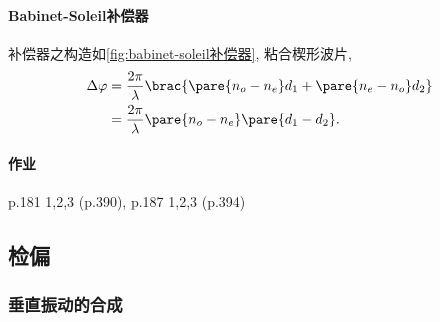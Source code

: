 \documentclass{ctexart}
\begin{document}
\paragraph{Babinet-Soleil补偿器} %
\label{par:babinet_soleil补偿器}

补偿器之构造如\cref{fig:babinet-soleil补偿器}, 粘合楔形波片,
\begin{align*}
    \Delta \varphi &= \frac{2\pi}{\lambda} \brac{\pare{n_o - n_e}d_1 + \pare{n_e - n_o}d_2} \\
    &= \frac{2\pi}{\lambda}\pare{n_o - n_e}\pare{d_1-d_2}.
\end{align*}


\paragraph{作业} %
\label{par:作业}

p.181 1,2,3 (p.390), p.187 1,2,3 (p.394)




\subsection{检偏} %
\label{sub:检偏}

\subsubsection{垂直振动的合成} %
\label{ssub:垂直振动的合成}
\end{document}
